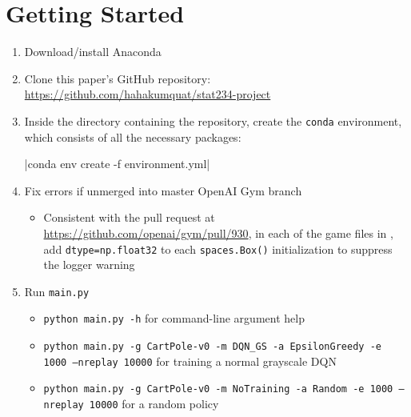 \documentclass[11pt]{article}
\begin{document}
\newpage
{}


\newpage

\appendix

\section{Getting Started}
\label{app:getting_started}

\begin{enumerate}
    \item Download/install Anaconda
    
    \item Clone this paper's GitHub repository: \url{https://github.com/hahakumquat/stat234-project}
    
    \item Inside the directory containing the repository, create the \texttt{conda} environment, which consists of all the necessary packages: 
    
    |conda env create -f environment.yml|

    \item Fix errors if unmerged into master OpenAI Gym branch
    
    \begin{itemize}
        \item Consistent with the pull request at \url{https://github.com/openai/gym/pull/930}, in each of the game files in , add \texttt{dtype=np.float32} to each \texttt{spaces.Box()} initialization to suppress the logger warning
    \end{itemize}
    
    \item Run \texttt{main.py}
    
    \begin{itemize}
        \item \texttt{python main.py -h} for command-line argument help
        \item \texttt{python main.py -g CartPole-v0 -m DQN\_GS -a EpsilonGreedy -e 1000 --nreplay 10000} for training a normal grayscale DQN
        \item \texttt{python main.py -g CartPole-v0 -m NoTraining -a Random -e 1000 --nreplay 10000} for a random policy
    \end{itemize}
\end{enumerate}
\end{document}
